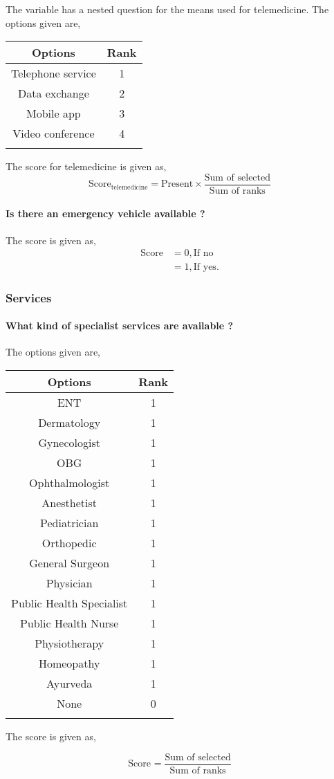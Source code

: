 \documentclass[oneside]{article}
\newcommand{\tsub}[2]{\text{#1}_{\text{#2}}}
\newcommand{\dsub}[2]{\dfrac{\text{#1}}{\text{#2}}}
\newcommand{\multsel}[1]
{
	\[
		\tsub{Score}{#1} = \dsub{Sum of selected}{Sum of ranks}
	\]
}
\newenvironment{ttable}
{
\begin{center}
\begin{tabular}{c|c}
\hline
}
{
\\ \hline
\end{tabular}
\end{center}
}
\begin{document}
The variable has a nested question for the means used for telemedicine. The options given are,
\begin{ttable}
	Options & Rank \\ \hline
	Telephone service & 1 \\
	Data exchange & 2 \\
	Mobile app & 3 \\
	Video conference & 4 \\ \hline
\end{ttable}
The score for telemedicine is given as,
\[
	\tsub{Score}{telemedicine} = \text{Present} \times \dsub{Sum of selected}{Sum of ranks}
\]	
\paragraph{ Is there an emergency vehicle available ?}

The score is given as,
\begin{align*}
\tsub{Score}{} &= 0, \text{If no} \\
        &= 1, \text{If yes}.
\end{align*}
\subsubsection{Services}

\paragraph{ What kind of specialist services are available ?}

The options given are,
\begin{ttable}
Options & Rank \\ \hline
ENT & 1 \\
Dermatology & 1 \\
Gynecologist & 1 \\
OBG & 1 \\
Ophthalmologist & 1 \\
Anesthetist & 1 \\
Pediatrician & 1 \\
Orthopedic & 1 \\
General Surgeon & 1 \\
Physician & 1 \\
Public Health Specialist & 1 \\
Public Health Nurse & 1 \\
Physiotherapy & 1 \\
Homeopathy & 1 \\
Ayurveda & 1 \\
None & 0 \\
\hline
\end{ttable}
The score is given as,
\multsel{}
\end{document}
